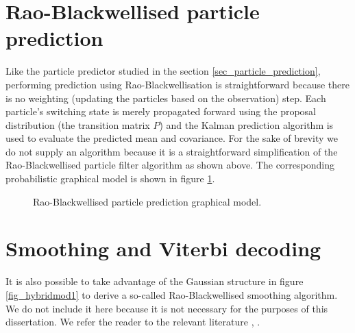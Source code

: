 \section{Rao-Blackwellised particle prediction}
\label{sec_inf_rbpf_pred}
Like the particle predictor studied in the section \ref{sec_particle_prediction}, performing prediction using Rao-Blackwellisation is straightforward because there is no weighting (updating the particles based on the observation) step. Each particle's switching state is merely propagated forward using the proposal distribution (the transition matrix $P$) and the Kalman prediction algorithm is used to evaluate the predicted mean and covariance. For the sake of brevity we do not supply an algorithm because it is a straightforward simplification of the Rao-Blackwellised particle filter algorithm as shown above. The corresponding probabilistic graphical model is shown in figure \ref{fig_hybridmod1_prediction}.
\begin{figure}[H] 
\centering
{}
\caption{Rao-Blackwellised particle prediction graphical model.}
\label{fig_hybridmod1_prediction}
\end{figure}

\section{Smoothing and Viterbi decoding}
It is also possible to take advantage of the Gaussian structure in figure \ref{fig_hybridmod1} to derive a so-called Rao-Blackwellised smoothing algorithm. We do not include it here because it is not necessary for the purposes of this dissertation. We refer the reader to the relevant literature \cite{chen}, \cite{doucet}.  

